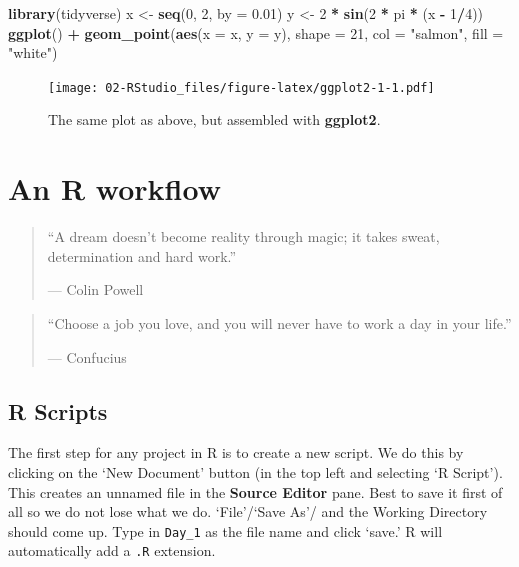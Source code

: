\documentclass[]{book}
\newenvironment{Shaded}{\begin{snugshade}}{\end{snugshade}}
\newcommand{\KeywordTok}[1]{\textcolor[rgb]{0.13,0.29,0.53}{\textbf{#1}}}
\newcommand{\DataTypeTok}[1]{\textcolor[rgb]{0.13,0.29,0.53}{#1}}
\newcommand{\DecValTok}[1]{\textcolor[rgb]{0.00,0.00,0.81}{#1}}
\newcommand{\FloatTok}[1]{\textcolor[rgb]{0.00,0.00,0.81}{#1}}
\newcommand{\StringTok}[1]{\textcolor[rgb]{0.31,0.60,0.02}{#1}}
\newcommand{\OperatorTok}[1]{\textcolor[rgb]{0.81,0.36,0.00}{\textbf{#1}}}
\newcommand{\NormalTok}[1]{#1}
\theoremstyle{definition}
\theoremstyle{definition}
\theoremstyle{definition}
\theoremstyle{remark}
\begin{document}
\begin{Shaded}
\begin{Highlighting}[]
\KeywordTok{library}\NormalTok{(tidyverse)}
\NormalTok{x <-}\StringTok{ }\KeywordTok{seq}\NormalTok{(}\DecValTok{0}\NormalTok{, }\DecValTok{2}\NormalTok{, }\DataTypeTok{by =} \FloatTok{0.01}\NormalTok{)}
\NormalTok{y <-}\StringTok{ }\DecValTok{2} \OperatorTok{*}\StringTok{ }\KeywordTok{sin}\NormalTok{(}\DecValTok{2} \OperatorTok{*}\StringTok{ }\NormalTok{pi }\OperatorTok{*}\StringTok{ }\NormalTok{(x }\OperatorTok{-}\StringTok{ }\DecValTok{1}\OperatorTok{/}\DecValTok{4}\NormalTok{))}
\KeywordTok{ggplot}\NormalTok{() }\OperatorTok{+}
\StringTok{  }\KeywordTok{geom_point}\NormalTok{(}\KeywordTok{aes}\NormalTok{(}\DataTypeTok{x =}\NormalTok{ x, }\DataTypeTok{y =}\NormalTok{ y), }\DataTypeTok{shape =} \DecValTok{21}\NormalTok{, }\DataTypeTok{col =} \StringTok{"salmon"}\NormalTok{, }\DataTypeTok{fill =} \StringTok{"white"}\NormalTok{)}
\end{Highlighting}
\end{Shaded}

\begin{figure}
\centering
\texttt{[image: 02-RStudio\_files/figure-latex/ggplot2-1-1.pdf]}
\caption{\label{fig:ggplot2-1}The same plot as above, but assembled with
\textbf{ggplot2}.}
\end{figure}

\chapter{An R workflow}\label{workflow}

\begin{quote}
``A dream doesn't become reality through magic; it takes sweat,
determination and hard work.''

--- Colin Powell
\end{quote}

\begin{quote}
``Choose a job you love, and you will never have to work a day in your
life.''

--- Confucius
\end{quote}

\section{R Scripts}\label{r-scripts}

The first step for any project in R is to create a new script. We do
this by clicking on the `New Document' button (in the top left and
selecting `R Script'). This creates an unnamed file in the
\textbf{Source Editor} pane. Best to save it first of all so we do not
lose what we do. `File'/`Save As'/ and the Working Directory should come
up. Type in \texttt{Day\_1} as the file name and click `save.' R will
automatically add a \texttt{.R} extension.
\end{document}
